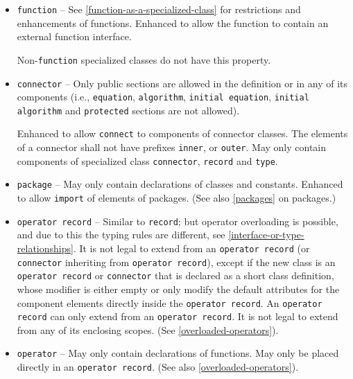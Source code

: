 \begin{itemize}
\item \lstinline!function! --
See \cref{function-as-a-specialized-class} for restrictions and enhancements of functions.
Enhanced to allow the function to contain an external function interface.

\begin{nonnormative}
Non-\lstinline!function! specialized classes do not have this property.
\end{nonnormative}

\item \lstinline!connector! --
Only public sections are allowed in the definition or in any of its components (i.e., \lstinline!equation!, \lstinline!algorithm!, \lstinline!initial equation!, \lstinline!initial algorithm! and \lstinline!protected! sections are not allowed).

Enhanced to allow \lstinline!connect! to components of connector classes.
The elements of a connector shall not have prefixes \lstinline!inner!, or \lstinline!outer!.
May only contain components of specialized class \lstinline!connector!, \lstinline!record! and \lstinline!type!.

\item \lstinline!package! --
May only contain declarations of classes and constants.
Enhanced to allow \lstinline!import! of elements of packages.
(See also \cref{packages} on packages.)

\item \lstinline!operator record! --
Similar to \lstinline!record!; but operator overloading is possible, and due to this the typing rules are different, see \cref{interface-or-type-relationships}.
It is not legal to extend from an \lstinline!operator record! (or \lstinline!connector! inheriting from \lstinline!operator record!), except if the new class is an \lstinline!operator record! or \lstinline!connector! that is declared as a short class definition, whose modifier is either empty or only modify the default attributes for the component elements directly inside the \lstinline!operator record!.
An \lstinline!operator record! can only extend from an \lstinline!operator record!.
It is not legal to extend from any of its enclosing scopes.
(See \cref{overloaded-operators}).

\item \lstinline!operator! --
May only contain declarations of functions.
May only be placed directly in an \lstinline!operator record!.
(See also \cref{overloaded-operators}).


\end{itemize}
